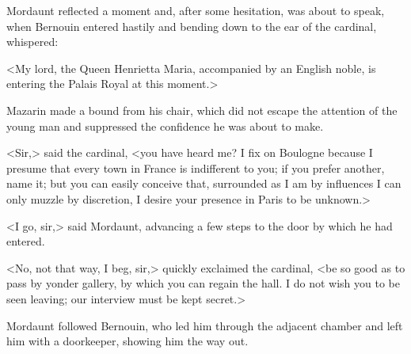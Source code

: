 Mordaunt reflected a moment and, after some hesitation, was about to speak, when Bernouin entered hastily and bending down to the ear of the cardinal, whispered:

<My lord, the Queen Henrietta Maria, accompanied by an English noble, is entering the Palais Royal at this moment.>

Mazarin made a bound from his chair, which did not escape the attention of the young man and suppressed the confidence he was about to make.

<Sir,> said the cardinal, <you have heard me? I fix on Boulogne because I presume that every town in France is indifferent to you; if you prefer another, name it; but you can easily conceive that, surrounded as I am by influences I can only muzzle by discretion, I desire your presence in Paris to be unknown.>

<I go, sir,> said Mordaunt, advancing a few steps to the door by which he had entered.

<No, not that way, I beg, sir,> quickly exclaimed the cardinal, <be so good as to pass by yonder gallery, by which you can regain the hall. I do not wish you to be seen leaving; our interview must be kept secret.>

Mordaunt followed Bernouin, who led him through the adjacent chamber and left him with a doorkeeper, showing him the way out.